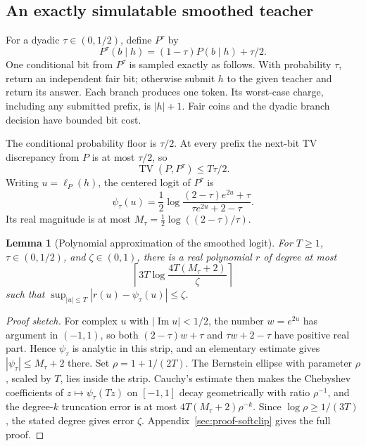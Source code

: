 \documentclass[11pt]{article}
\newcommand{\TV}{\operatorname{TV}}
\newtheorem{lemma}[theorem]{Lemma}
\theoremstyle{definition}
\theoremstyle{remark}
\begin{document}
\subsection{An exactly simulatable smoothed teacher}

For a dyadic $\tau\in(0,1/2)$, define $P^\tau$ by
\[
P^\tau(b\mid h)=(1-\tau)P(b\mid h)+\tau/2.
\]
One conditional bit from $P^\tau$ is sampled exactly as follows. With probability $\tau$, return an independent fair bit; otherwise submit $h$ to the given teacher and return its answer. Each branch produces one token. Its worst-case charge, including any submitted prefix, is $|h|+1$. Fair coins and the dyadic branch decision have bounded bit cost.

The conditional probability floor is $\tau/2$. At every prefix the next-bit TV discrepancy from $P$ is at most $\tau/2$, so
\begin{equation}\label{eq:smoothing-tv}
\TV(P,P^\tau)\le T\tau/2.
\end{equation}
Writing $u=\ell_P(h)$, the centered logit of $P^\tau$ is
\begin{equation}\label{eq:softclip}
\psi_\tau(u)=\frac12\log
\frac{(2-\tau)e^{2u}+\tau}{\tau e^{2u}+2-\tau}.
\end{equation}
Its real magnitude is at most
$M_\tau=\tfrac12\log((2-\tau)/\tau)$.

\begin{lemma}[Polynomial approximation of the smoothed logit]\label{lem:softclip-poly}
For $T\ge1$, $\tau\in(0,1/2)$, and $\zeta\in(0,1)$, there is a real polynomial $r$ of degree at most
\[
\left\lceil3T\log\frac{4T(M_\tau+2)}{\zeta}\right\rceil
\]
such that $\sup_{|u|\le T}|r(u)-\psi_\tau(u)|\le\zeta$.
\end{lemma}
\begin{proof}[Proof sketch]
For complex $u$ with $|\operatorname{Im}u|<1/2$, the number $w=e^{2u}$ has argument in $(-1,1)$, so both $(2-\tau)w+\tau$ and $\tau w+2-\tau$ have positive real part. Hence $\psi_\tau$ is analytic in this strip, and an elementary estimate gives $|\psi_\tau|\le M_\tau+2$ there. Set $\rho=1+1/(2T)$. The Bernstein ellipse with parameter $\rho$, scaled by $T$, lies inside the strip. Cauchy's estimate then makes the Chebyshev coefficients of $z\mapsto\psi_\tau(Tz)$ on $[-1,1]$ decay geometrically with ratio $\rho^{-1}$, and the degree-$k$ truncation error is at most $4T(M_\tau+2)\rho^{-k}$. Since $\log\rho\ge1/(3T)$, the stated degree gives error $\zeta$. Appendix~\ref{sec:proof-softclip} gives the full proof.
\end{proof}
\end{document}
